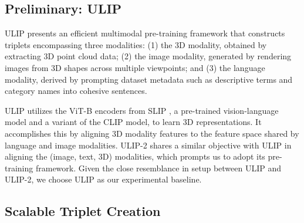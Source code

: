\documentclass[10pt,twocolumn,letterpaper]{article}
\begin{document}

\subsection{Preliminary: ULIP}

ULIP \cite{xue2022ulip} presents an efficient multimodal pre-training framework that constructs triplets encompassing three modalities: (1) the 3D modality, obtained by extracting 3D point cloud data; (2) the image modality, generated by rendering images from 3D shapes across multiple viewpoints; and (3) the language modality, derived by prompting dataset metadata such as descriptive terms and category names into cohesive sentences.

ULIP utilizes the ViT-B encoders from SLIP \cite{mu2022slip}, a pre-trained vision-language model and a variant of the CLIP model, to learn 3D representations. It accomplishes this by aligning 3D modality features to the feature space shared by language and image modalities. ULIP-2 shares a similar objective with ULIP in aligning the (image, text, 3D) modalities, which prompts us to adopt its pre-training framework. Given the close resemblance in setup between ULIP and ULIP-2, we choose ULIP as our experimental baseline.



\subsection{Scalable Triplet Creation}
\end{document}
